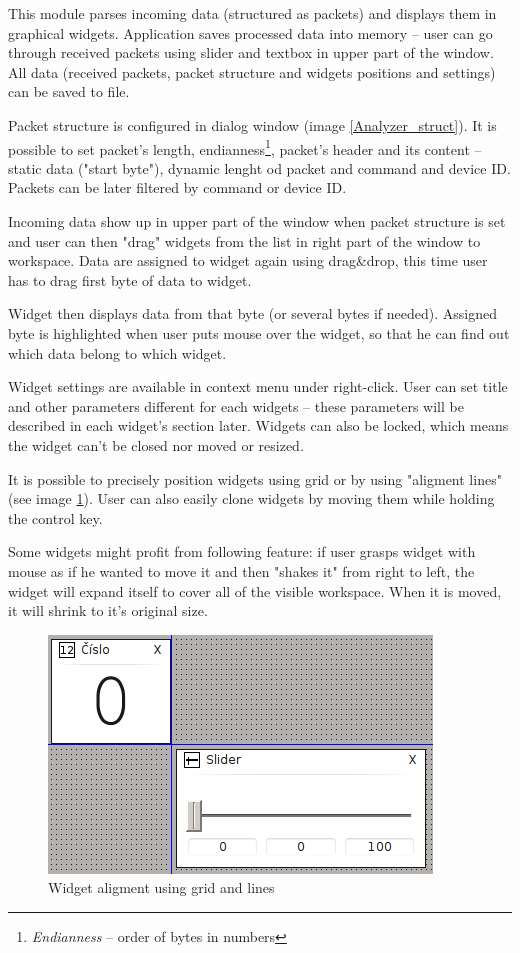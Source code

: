 \documentclass[12pt, a4paper, oneside]{article}
\newcommand{\It}{\textit}  %
\begin{document}
This module parses incoming data (structured as packets) and displays them in graphical widgets. Application saves processed data into memory -- user can go through received packets using slider and textbox in upper part of the window. All data (received packets, packet structure and widgets positions and settings) can be saved to file. 

Packet structure is configured in dialog window (image \ref{Analyzer_struct}). It is possible to set packet's length, endianness\footnote{\It{Endianness} -- order of bytes in numbers}, packet's header and its content -- static data ("start byte"), dynamic lenght od packet and command and device ID. Packets can be later filtered by command or device ID.

\newpage
\setlength{\voffset}{0mm}
\pagestyle{plain}

Incoming data show up in upper part of the window when packet structure is set and user can then "drag" widgets from the list in right part of the window to workspace. Data are assigned to widget again using drag\&drop, this time user has to drag first byte of data to widget.

Widget then displays data from that byte (or several bytes if needed). Assigned byte is highlighted when user puts mouse over the widget, so that he can find out which data belong to which widget.

Widget settings are available in context menu under right-click. User can set title and other parameters different for each widgets -- these parameters will be described in each widget's section later. Widgets can also be locked, which means the widget can't be closed nor moved or resized.

It is possible to precisely position widgets using grid or by using "aligment lines" (see image \ref{widget_lines}). User can also easily clone widgets by moving them while holding the control key.

Some widgets might profit from following feature: if user grasps widget with mouse as if he wanted to move it and then "shakes it" from right to left, the widget will expand itself to cover all of the visible workspace. When it is moved, it will shrink to it's original size.

\begin{figure}[H]
\begin{center}
\includegraphics[scale=1]{img/lines.png}
\caption{Widget aligment using grid and lines}
\label{widget_lines}
\end{center}
\end{figure}
\end{document}
